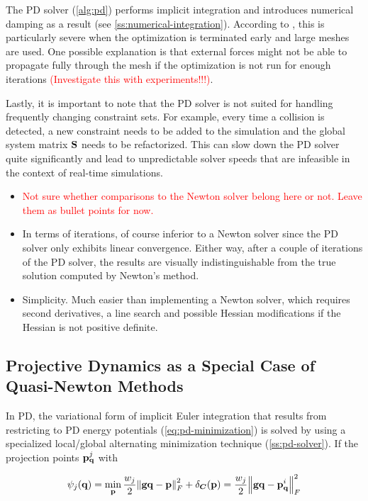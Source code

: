 The PD solver (\cref{alg:pd}) performs implicit integration and introduces numerical damping as a result (see \cref{ss:numerical-integration}).
According to \cite{bouaziz2014}, this is particularly severe when the optimization is terminated early and large meshes are used. One possible
explanation is that external forces might not be able to propagate fully through the mesh if the optimization is not run for enough iterations
\cite{bouaziz2014} \textcolor{red}{(Investigate this with experiments!!!)}.

Lastly, it is important to note that the PD solver is not suited for handling frequently changing constraint sets. For example, every time 
a collision is detected, a new constraint needs to be added to the simulation and the global system matrix $\mathbf{S}$ needs
to be refactorized. This can slow down the PD solver quite significantly and lead to unpredictable solver speeds that are infeasible in the
context of real-time simulations.

\begin{itemize}
    \item \textcolor{red}{Not sure whether comparisons to the Newton solver belong here or not. Leave them as bullet points for now.}
    \item In terms of iterations, of course inferior to a Newton solver since the PD solver only exhibits linear convergence. 
        Either way, after a couple of iterations of the PD solver, the results are visually 
        indistinguishable from the true solution computed by Newton's method.
    \item Simplicity. Much easier than implementing a Newton solver, which requires second derivatives, a line search and possible 
        Hessian modifications if the Hessian is not positive definite. 
\end{itemize}

\subsection{Projective Dynamics as a Special Case of Quasi-Newton Methods}\label{ss:pd-quasi-newton}
In PD, the variational form of implicit Euler integration that results from restricting to PD energy potentials (\cref{eq:pd-minimization}) 
is solved by using a specialized local/global alternating minimization technique (\cref{ss:pd-solver}). If the projection points 
$\mathbf{p}^j_{\mathbf{q}}$ with 

\[
    \psi_j({\mathbf{q}}) = \min_{\mathbf{p}} \frac{w_j}{2} \norm{\mathbf{gq} - \mathbf{p}}^2_F + \delta_{\bm{C}}(\mathbf{p})
    = \frac{w_j}{2} \norm{\mathbf{gq} - \mathbf{p}^i_\mathbf{q}}^2_F
\]

